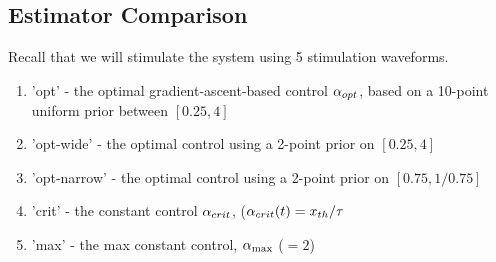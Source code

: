 % 

% 



\subsection{Estimator Comparison}
Recall that we will stimulate the system using 5 stimulation
waveforms.  
\begin{enumerate}
  \item 'opt' - the optimal gradient-ascent-based  control $\alpha_{opt}$, based on
  a 10-point uniform prior between $[0.25, 4]$
  \item  'opt-wide' - the optimal control using a 2-point prior on  $[0.25, 4]$
  \item 'opt-narrow' - the optimal control using a 2-point prior on $[0.75,
  1/0.75]$
\item   'crit' - the constant control
$\alpha_{crit}$, ($\alpha_{crit}(t) =  { x_{th} }/{ \tau }$
\item  'max' - the max constant control, ${ \alpha_{\textrm{max}} }$ ($=2$)
\end{enumerate} 

